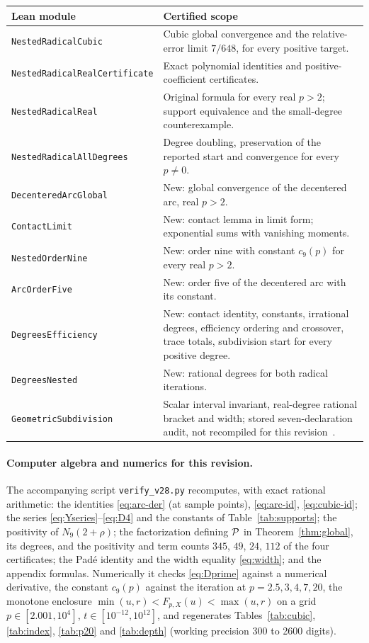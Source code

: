 \begin{center}\small
\begin{tabularx}{\linewidth}{@{}lX@{}}
\toprule
Lean module & Certified scope\\
\midrule
\texttt{NestedRadicalCubic} & Cubic global convergence and the relative-error limit $7/648$, for every
positive target.\\
\texttt{NestedRadicalRealCertificate} & Exact polynomial identities and positive-coefficient
certificates.\\
\texttt{NestedRadicalReal} & Original formula for every real $p>2$; support equivalence and the
small-degree counterexample.\\
\texttt{NestedRadicalAllDegrees} & Degree doubling, preservation of the reported start and convergence
for every $p\neq0$.\\
\texttt{DecenteredArcGlobal} & New: global convergence of the decentered arc, real $p>2$.\\
\texttt{ContactLimit} & New: contact lemma in limit form; exponential sums with vanishing moments.\\
\texttt{NestedOrderNine} & New: order nine with constant $c_9(p)$ for every real $p>2$.\\
\texttt{ArcOrderFive} & New: order five of the decentered arc with its constant.\\
\texttt{DegreesEfficiency} & New: contact identity, constants, irrational degrees, efficiency ordering
and crossover, trace totals, subdivision start for every positive degree.\\
\texttt{DegreesNested} & New: rational degrees for both radical iterations.\\
\texttt{GeometricSubdivision} & Scalar interval invariant, real-degree rational bracket and width;
stored seven-declaration audit, not recompiled for this revision~\cite{supplS}.\\
\bottomrule
\end{tabularx}
\end{center}

\paragraph{Computer algebra and numerics for this revision.}
The accompanying script \texttt{verify\_v28.py} recomputes, with exact rational arithmetic: the
identities \eqref{eq:arc-der} (at sample points), \eqref{eq:arc-id}, \eqref{eq:cubic-id}; the series
\eqref{eq:Yseries}--\eqref{eq:D4} and the constants of Table~\ref{tab:supports}; the positivity of
$N_9(2+\rho)$; the factorization defining $\mathcal{P}$ in Theorem~\ref{thm:global}, its degrees, and the
positivity and term counts $345$, $49$, $24$, $112$ of the four certificates; the Pad\'e identity and
the width equality \eqref{eq:width}; and the appendix formulas. Numerically it checks
\eqref{eq:Dprime} against a numerical derivative, the constant $c_9(p)$ against the iteration
at $p=2.5,3,4,7,20$, the monotone enclosure $\min(u,r)<F_{p,X}(u)<\max(u,r)$ on a grid
$p\in[2.001,10^{4}]$, $t\in[10^{-12},10^{12}]$, and regenerates Tables~\ref{tab:cubic}, \ref{tab:index},
\ref{tab:p20} and \ref{tab:depth} (working precision 300 to 2600 digits).

